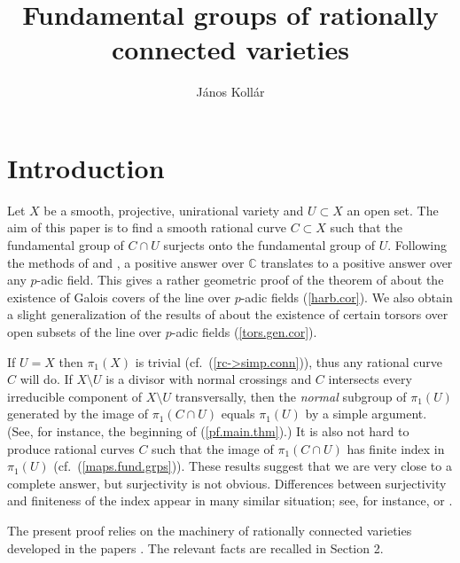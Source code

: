 \documentclass[12pt,twoside]{amsart}
\renewcommand{\c}[0]{{\mathbb C}}
\theoremstyle{definition}
\theoremstyle{remark}
\begin{document}




\title{Fundamental groups of rationally connected varieties}
\author{J\'anos Koll\'ar}


\maketitle

\section{Introduction}

Let $X$ be a smooth, projective, unirational  variety and 
$U\subset X$ an open set.
 The aim of this paper is to find a smooth rational curve $C\subset X$
such that the fundamental group of $C\cap U$ surjects onto the
fundamental group of $U$. 
Following the methods of \cite{rcloc} and \cite{ct-harb},
  a positive answer
over $\c$ translates  to a positive answer over any $p$-adic field.
This gives a rather geometric proof of the theorem of
\cite{harb} about the existence of Galois covers of the  line over $p$-adic
 fields (\ref{harb.cor}). We also obtain a slight
generalization of  the results of \cite{ct-harb} about the
existence of certain torsors  over open subsets of the  line
over $p$-adic fields (\ref{tors.gen.cor}). 





If $U=X$ then $\pi_1(X)$ is trivial  (cf.\ (\ref{rc->simp.conn})),
 thus any rational
curve $C$ will do. If $X\setminus U$ is a divisor with normal crossings
and $C$ intersects every irreducible component of  $X\setminus U$
transversally, then the {\it normal} subgroup of $\pi_1(U)$ generated by 
the image of 
$\pi_1(C\cap U)$ equals $\pi_1(U)$ by a simple argument. 
(See, for instance, the beginning of (\ref{pf.main.thm}).)
It is also not hard to produce rational curves $C$ such that the image of
$\pi_1(C\cap U)$ has finite index in  $\pi_1(U)$  
(cf.\ (\ref{maps.fund.grps})). 
These  results  suggest that we are very close to a complete answer,
but surjectivity is not obvious.
Differences between surjectivity and finiteness of the  index 
appear in many similar situation; see, for instance,
\cite[Part I]{shafbook} or \cite{nap-ram}.


The present proof relies on  the  machinery of rationally connected varieties
developed in the papers \cite{kmm1, kmm2, kmm3}.  
The relevant facts are recalled in Section 2.
\medskip
\end{document}
